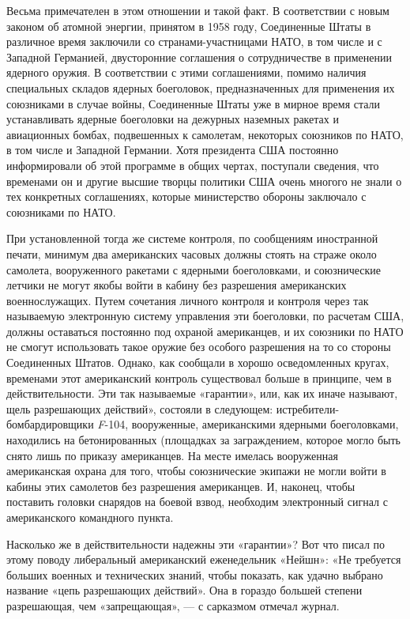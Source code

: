 \documentclass[12pt, a4paper, openany]{book}
\begin{document}
	Весьма примечателен в этом отношении и такой факт. В соответствии с новым законом об атомной энергии, принятом в 1958 году, Соединенные Штаты в различное время заключили со странами-участницами НАТО, в том числе и с Западной Германией, двусторонние соглашения о сотрудничестве в применении ядерного оружия. В соответствии с этими соглашениями, помимо наличия специальных складов ядерных боеголовок, предназначенных для применения их союзниками в случае войны, Соединенные Штаты уже в мирное время стали устанавливать ядерные боеголовки на дежурных наземных ракетах и авиационных бомбах, подвешенных к самолетам, некоторых союзников по НАТО, в том числе и Западной Германии. Хотя президента США постоянно информировали об этой программе в общих чертах, поступали сведения, что временами он и другие высшие творцы политики США очень многого не знали о тех конкретных соглашениях, которые министерство обороны заключало с союзниками по НАТО. 
	
	При установленной тогда же системе контроля, по сообщениям иностранной печати, минимум два американских часовых должны стоять на страже около самолета, вооруженного ракетами с ядерными боеголовками, и союзнические летчики не могут якобы войти в кабину без разрешения американских военнослужащих. Путем сочетания личного контроля и контроля через так называемую электронную систему управления эти боеголовки, по расчетам США, должны оставаться постоянно под охраной американцев, и их союзники по НАТО не смогут использовать такое оружие без особого разрешения на то со стороны Соединенных Штатов. Однако, как сообщали в хорошо осведомленных кругах, временами этот американский контроль существовал больше в принципе, чем в действительности. Эти так называемые «гарантии», или, как их иначе называют, щель разрешающих действий», состояли в следующем: истребители-бомбардировщики \textit{F}-104, вооруженные, американскими ядерными боеголовками, находились на бетонированных (площадках за заграждением, которое могло быть снято лишь по приказу американцев. На месте имелась вооруженная американская охрана для того, чтобы союзнические экипажи не могли войти в кабины этих самолетов без разрешения американцев. И, наконец, чтобы поставить головки снарядов на боевой взвод, необходим электронный сигнал с американского командного пункта.
	
	Насколько же в действительности надежны эти «гарантии»? Вот что писал по этому поводу либеральный американский еженедельник «Нейшн»: «Не требуется больших военных и технических знаний, чтобы показать, как удачно выбрано название «цепь разрешающих действий». Она в гораздо большей степени разрешающая, чем «запрещающая», — с сарказмом отмечал журнал.
	
\end{document}
